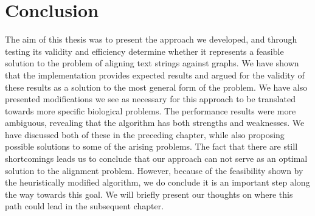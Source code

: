 \documentclass[thesis.tex]{subfiles}
\begin{document}
\chapter{Conclusion}
The aim of this thesis was to present the approach we developed, and through testing its validity and efficiency determine whether it represents a feasible solution to the problem of aligning text strings against graphs. We have shown that the implementation provides expected results and argued for the validity of these results as a solution to the most general form of the problem. We have also presented modifications we see as necessary for this approach to be translated towards more specific biological problems. The performance results were more ambiguous, revealing that the algorithm has both strengths and weaknesses. We have discussed both of these in the preceding chapter, while also proposing possible solutions to some of the arising problems. The fact that there  are still shortcomings leads us to conclude that our approach can not serve as an optimal solution to the alignment problem. However, because of the feasibility shown by the heuristically modified algorithm, we do conclude it is an important step along the way towards this goal. We will briefly present our thoughts on where this path could lead in the subsequent chapter.
\end{document}
